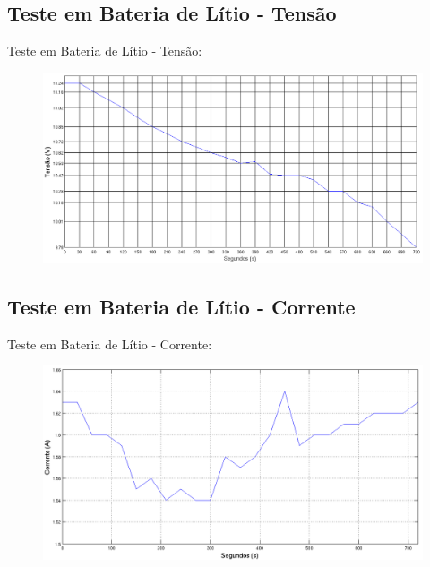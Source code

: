 \documentclass{beamer}
\begin{document}
\subsection{Teste em Bateria de Lítio - Tensão}
\begin{frame}
  Teste em Bateria de Lítio - Tensão:
        \begin{figure}
          \centering
          \includegraphics[width=1\linewidth]{energia_1}
        \end{figure}
\end{frame}

\subsection{Teste em Bateria de Lítio - Corrente}
\begin{frame}
  Teste em Bateria de Lítio - Corrente:
        \begin{figure}
          \centering
          \includegraphics[width=1\linewidth]{energia_2}
        \end{figure}
\end{frame}
\end{document}
